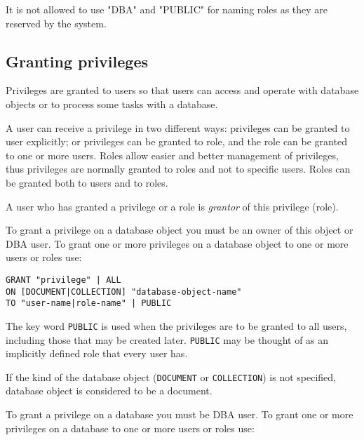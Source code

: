 \documentclass[a4paper,12pt]{article}
\begin{document}
It is not allowed to use "DBA" and "PUBLIC" for naming roles as they are reserved by the system.

\subsection{Granting privileges}

Privileges are granted to users so that users can access and operate with database objects or to process some tasks with a database.

A user can receive a privilege in two different ways: privileges can be granted to user explicitly; or privileges can be granted to role, and the role can be granted to one or more users. Roles allow easier and better management of privileges, thus privileges are normally granted to roles and not to specific users. Roles can be granted both to users and to roles.

A user who has granted a privilege or a role is \emph{grantor} of this privilege (role).

To grant a privilege on a database object you must be an owner of this object or DBA user. To grant one or more privileges on a database object to one or more users or roles use:


\begin{verbatim}
GRANT "privilege" | ALL
ON [DOCUMENT|COLLECTION] "database-object-name" 
TO "user-name|role-name" | PUBLIC
\end{verbatim}

The key word \verb!PUBLIC! is used when the privileges are to be granted to all users, including those that may be created later. \verb!PUBLIC! may be thought of as an implicitly defined role that every user has.

If the kind of the database object (\verb!DOCUMENT! or \verb!COLLECTION!) is not specified, database object is considered to be a document.

To grant a privilege on a database you must be DBA user. To grant one or more privileges on a database to one or more users or roles use:

\end{document}
